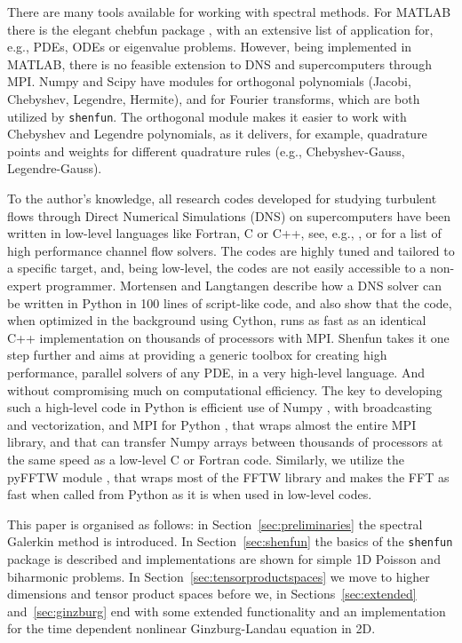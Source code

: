 \documentclass[%
oneside,                 %
final,                   %
10pt]{article}
\theoremstyle{definition}
\begin{document}
There are many tools available for working with spectral methods. For MATLAB there is the elegant chebfun package \cite{trefethen13}, with an extensive list of application for, e.g., PDEs, ODEs or eigenvalue problems. However, being implemented in MATLAB, there is no feasible extension to DNS and supercomputers through MPI. Numpy and Scipy have modules for orthogonal polynomials (Jacobi, Chebyshev, Legendre, Hermite), and for Fourier transforms, which are both utilized by \texttt{shenfun}. The orthogonal module makes it easier to work with Chebyshev and Legendre polynomials, as it delivers, for example, quadrature points and weights for different quadrature rules (e.g., Chebyshev-Gauss, Legendre-Gauss). 

To the author's knowledge, all research codes developed for studying turbulent flows through Direct Numerical Simulations (DNS) on supercomputers have been written in low-level languages like Fortran, C or C++, see, e.g., \cite{debruynkops15,hoyas06,leemoser15}, or \cite{Alfonsi2016} for a list of high performance channel flow solvers. The codes are  highly tuned and tailored to a specific target, and, being low-level, the codes are not easily accessible to a non-expert programmer. Mortensen and Langtangen \cite{Mortensen2016} describe how a DNS solver can be written in Python in 100 lines of script-like code, and also show that the code, when optimized in the background using Cython, runs as fast as an identical C++ implementation on thousands of processors with MPI. {Shenfun} takes it one step further and aims at providing a generic toolbox for creating high performance, parallel solvers of any PDE, in a very high-level language. And without compromising much on computational efficiency. The key to developing such a high-level code in Python is efficient use of Numpy \cite{numpy}, with broadcasting and vectorization, and MPI for Python \cite{mpi4py}, that wraps almost the entire MPI library, and that can transfer Numpy arrays between thousands of processors at the same speed as a low-level C or Fortran code. Similarly, we utilize the pyFFTW module \cite{pyfftw}, that wraps most of the FFTW library \cite{libfftw} and makes the FFT as fast when called from Python as it is when used in low-level codes.

This paper is organised as follows: in Section~\ref{sec:preliminaries} the spectral Galerkin method is introduced. In Section~\ref{sec:shenfun} the basics of the \texttt{shenfun} package is described and implementations are shown for simple 1D Poisson and biharmonic problems. In Section~\ref{sec:tensorproductspaces} we move to higher dimensions and tensor product spaces before we, in Sections~\ref{sec:extended} and~\ref{sec:ginzburg} end with some extended functionality and an implementation for the time dependent nonlinear Ginzburg-Landau equation in 2D.
\end{document}
